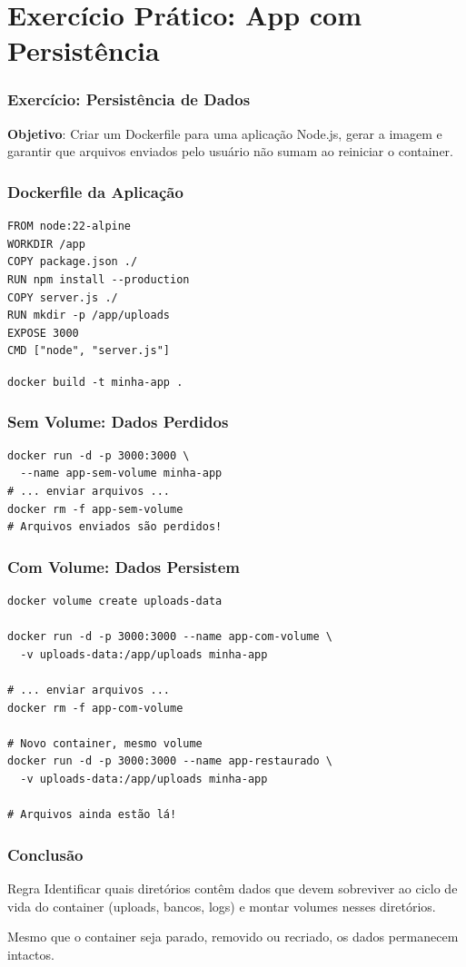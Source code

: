 \section{Exercício Prático: App com Persistência}

\begin{frame}
  \frametitle{Exercício: Persistência de Dados}
  \textbf{Objetivo}: Criar um Dockerfile para uma aplicação Node.js, gerar a imagem e
  garantir que arquivos enviados pelo usuário não sumam ao reiniciar o container.
\end{frame}

\begin{frame}[fragile]
  \frametitle{Dockerfile da Aplicação}
\begin{verbatim}
FROM node:22-alpine
WORKDIR /app
COPY package.json ./
RUN npm install --production
COPY server.js ./
RUN mkdir -p /app/uploads
EXPOSE 3000
CMD ["node", "server.js"]
\end{verbatim}

  \vspace{0.3em}
  \texttt{docker build -t minha-app .}
\end{frame}

\begin{frame}[fragile]
  \frametitle{Sem Volume: Dados Perdidos}
\begin{verbatim}
docker run -d -p 3000:3000 \
  --name app-sem-volume minha-app
# ... enviar arquivos ...
docker rm -f app-sem-volume
# Arquivos enviados são perdidos!
\end{verbatim}
\end{frame}

\begin{frame}[fragile]
  \frametitle{Com Volume: Dados Persistem}
\begin{verbatim}
docker volume create uploads-data

docker run -d -p 3000:3000 --name app-com-volume \
  -v uploads-data:/app/uploads minha-app

# ... enviar arquivos ...
docker rm -f app-com-volume

# Novo container, mesmo volume
docker run -d -p 3000:3000 --name app-restaurado \
  -v uploads-data:/app/uploads minha-app

# Arquivos ainda estão lá!
\end{verbatim}
\end{frame}

\begin{frame}
  \frametitle{Conclusão}
  \begin{block}{Regra}
    Identificar quais diretórios contêm dados que devem sobreviver ao ciclo
    de vida do container (uploads, bancos, logs) e montar volumes nesses diretórios.
  \end{block}

  \vspace{0.5em}
  Mesmo que o container seja parado, removido ou recriado, os dados permanecem intactos.
\end{frame}
